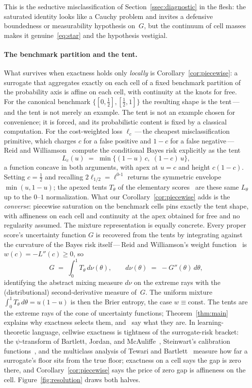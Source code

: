 \documentclass{article}
\theoremstyle{plain}
\theoremstyle{definition}
\begin{document}
This is the seductive misclassification of
Section~\ref{ssec:diagnostic} in the flesh: the saturated identity
looks like a Cauchy problem and invites a defensive boundedness or
measurability hypothesis on~$G$, but the continuum of cell masses
makes it genuine~\eqref{eq:star} and the hypothesis vestigial.

\paragraph{The benchmark partition and the tent.}
What survives when exactness holds only \emph{locally} is
Corollary~\ref{cor:piecewise}: a surrogate that aggregates exactly on
each cell of a fixed benchmark partition of the probability axis is
affine on each cell, with continuity at the knots for free. For the
canonical benchmark $\{[0,\tfrac12],[\tfrac12,1]\}$ the resulting
shape is the tent\,---\,and the tent is not merely an example.
The tent is not an example chosen for convenience; it is forced, and its
probabilistic content is fixed by a classical computation. For the
cost-weighted loss $\ell_c$\,---\,the cheapest misclassification primitive,
which charges $c$ for a false positive and $1-c$ for a false
negative\,---\,Reid and Williamson~\cite[Thm~14]{ReidWilliamson2011} compute
the conditional Bayes risk explicitly as the tent
\[
L_c(u)\;=\;\min\bigl\{(1-u)\,c,\;(1-c)\,u\bigr\},
\]
a function concave in both arguments, with apex at $u=c$ and height $c(1-c)$.
Setting $c=\tfrac12$ and recalling $2\ell_{1/2}=\ell^{0\text{-}1}$ returns the
symmetric envelope $\min(u,1-u)$; the apexed tents $T_\theta$ of the elementary
scores~\cite{Schervish1989,EGJK2016} are these same $L_\theta$ up to the
$0$--$1$ normalization. What our Corollary~\ref{cor:piecewise} adds is the
\emph{converse}: piecewise saturation on the benchmark cells pins exactly the
tent shape, with affineness on each cell and continuity at the apex obtained
for free and no regularity assumed. The mixture representation is equally
concrete. Every proper score's uncertainty function $G$ is recovered from the
tents by integrating against the curvature of the Bayes risk
itself\,---\,Reid and Williamson's weight
function~\cite[Thm~16]{ReidWilliamson2011} is $w(c)=-L''(c)\ge0$, so
\[
G\;=\;\int_0^1 T_\theta\,d\nu(\theta),
\qquad d\nu(\theta)\;=\;-G''(\theta)\,d\theta,
\]
identifying the abstract mixing measure $d\nu$ on the extreme rays with the
(distributional) second-derivative measure of~$G$. The uniform mixture
$\int_0^1 T_\theta\,d\theta = u(1-u)$ is then the Brier entropy, the case
$w\equiv\mathrm{const}$. The tents are the extreme rays of the cone of
uncertainty functions; Theorem~\ref{thm:main} explains why exactness selects
them, and~\cite[Thms~14,~16]{ReidWilliamson2011} say what they are. In learning-theoretic language,
cellwise exactness is tightness of the surrogate-risk bracket: the
$\psi$-transform of Bartlett, Jordan, and McAuliffe~\cite{BJM2006},
Steinwart's calibration functions~\cite{Steinwart2007}, and the
multiclass analysis of Tewari and
Bartlett~\cite{TewariBartlett2007} measure how far a surrogate's
floor sits from the true floor; exactness on a cell says the gap is
zero there, and Corollary~\ref{cor:piecewise} says the price of zero
gap is affineness on the cell. Figure~\ref{fig:resolution} draws
both halves.
\end{document}
